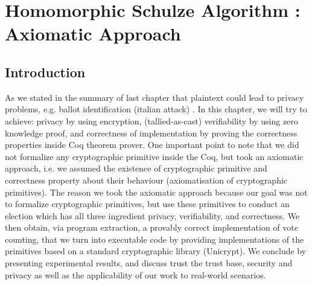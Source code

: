 \chapter{Homomorphic Schulze Algorithm : Axiomatic Approach}
\label{cha:homormorphic_schulze}

\section{Introduction}
As we stated in the  summary of last chapter that plaintext could lead to 
privacy problems, e.g. ballot identification (italian attack) \cite{Otten}. 
In this chapter, we will try to achieve: privacy by using encryption, (tallied-as-cast) 
verifiability by using zero knowledge proof, and correctness of implementation 
by proving the correctness properties inside Coq theorem prover. 
One important point to note that we did not formalize any cryptographic primitive inside the Coq, but 
took an axiomatic approach, i.e. we assumed the existence of cryptographic 
primitive and correctness property about their behaviour (axiomatisation of 
cryptographic primitives). The reason we took the axiomatic approach 
because our goal was not to formalize cryptographic primitives, but use these primitives
to conduct an election which has all three ingredient privacy, verifiability, 
and correctness. We then obtain, via program extraction, a
provably correct implementation of vote counting, that we turn
into executable code by providing implementations of the primitives
based on a standard cryptographic library (Unicrypt). 
We conclude by presenting
experimental results, and discuss trust the trust base, security and
privacy as well as the applicability of our work to real-world
scenarios. 




